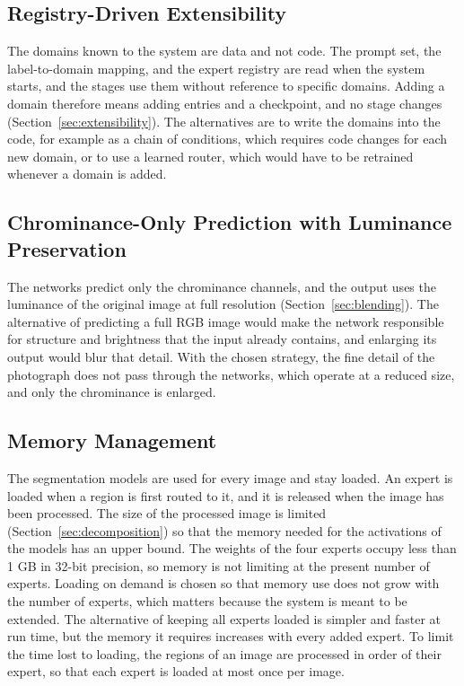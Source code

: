 \documentclass{FastFyp}
\begin{document}
\subsection{Registry-Driven Extensibility}

The domains known to the system are data and not code. The prompt set, the label-to-domain mapping, and the expert registry are read when the system starts, and the stages use them without reference to specific domains. Adding a domain therefore means adding entries and a checkpoint, and no stage changes (Section~\ref{sec:extensibility}). The alternatives are to write the domains into the code, for example as a chain of conditions, which requires code changes for each new domain, or to use a learned router, which would have to be retrained whenever a domain is added.

\subsection{Chrominance-Only Prediction with Luminance Preservation}

The networks predict only the chrominance channels, and the output uses the luminance of the original image at full resolution (Section~\ref{sec:blending}). The alternative of predicting a full RGB image would make the network responsible for structure and brightness that the input already contains, and enlarging its output would blur that detail. With the chosen strategy, the fine detail of the photograph does not pass through the networks, which operate at a reduced size, and only the chrominance is enlarged.

\subsection{Memory Management}

The segmentation models are used for every image and stay loaded. An expert is loaded when a region is first routed to it, and it is released when the image has been processed. The size of the processed image is limited (Section~\ref{sec:decomposition}) so that the memory needed for the activations of the models has an upper bound. The weights of the four experts occupy less than 1 GB in 32-bit precision, so memory is not limiting at the present number of experts. Loading on demand is chosen so that memory use does not grow with the number of experts, which matters because the system is meant to be extended. The alternative of keeping all experts loaded is simpler and faster at run time, but the memory it requires increases with every added expert. To limit the time lost to loading, the regions of an image are processed in order of their expert, so that each expert is loaded at most once per image.
\end{document}
